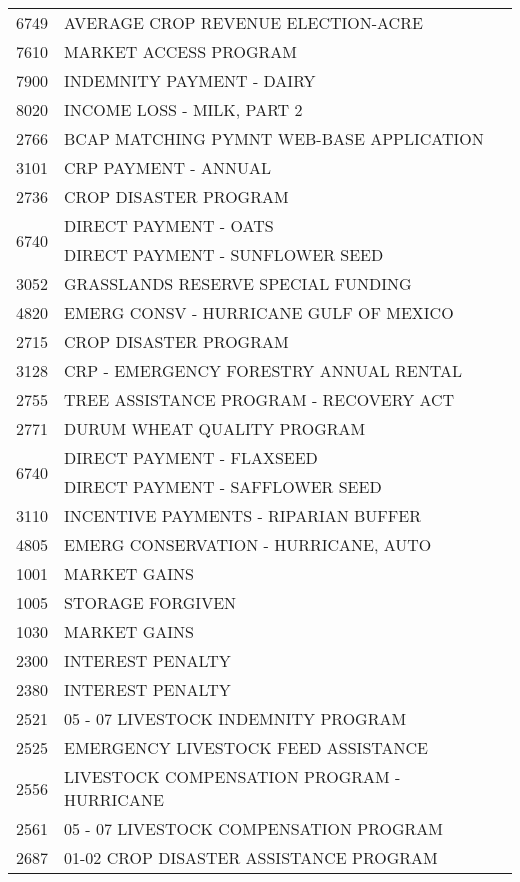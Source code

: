 \begin{longtable}{ll}
\cline{1-2}
6749 & AVERAGE CROP REVENUE ELECTION-ACRE \\
\cline{1-2}
7610 & MARKET ACCESS PROGRAM \\
\cline{1-2}
7900 & INDEMNITY PAYMENT - DAIRY \\
\cline{1-2}
8020 & INCOME LOSS - MILK, PART 2 \\
\cline{1-2}
2766 & BCAP MATCHING PYMNT WEB-BASE APPLICATION \\
\cline{1-2}
3101 & CRP PAYMENT - ANNUAL \\
\cline{1-2}
2736 & CROP DISASTER PROGRAM \\
\cline{1-2}
\multirow[t]{2}{*}{6740} & DIRECT PAYMENT - OATS \\
 & DIRECT PAYMENT - SUNFLOWER SEED \\
\cline{1-2}
3052 & GRASSLANDS RESERVE SPECIAL FUNDING \\
\cline{1-2}
4820 & EMERG CONSV - HURRICANE GULF OF MEXICO \\
\cline{1-2}
2715 & CROP DISASTER PROGRAM \\
\cline{1-2}
3128 & CRP - EMERGENCY FORESTRY ANNUAL RENTAL \\
\cline{1-2}
2755 & TREE ASSISTANCE PROGRAM - RECOVERY ACT \\
\cline{1-2}
2771 & DURUM WHEAT QUALITY PROGRAM \\
\cline{1-2}
\multirow[t]{2}{*}{6740} & DIRECT PAYMENT - FLAXSEED \\
 & DIRECT PAYMENT - SAFFLOWER SEED \\
\cline{1-2}
3110 & INCENTIVE PAYMENTS - RIPARIAN BUFFER \\
\cline{1-2}
4805 & EMERG CONSERVATION - HURRICANE, AUTO \\
\cline{1-2}
1001 & MARKET GAINS \\
\cline{1-2}
1005 & STORAGE FORGIVEN \\
\cline{1-2}
1030 & MARKET GAINS \\
\cline{1-2}
2300 & INTEREST PENALTY \\
\cline{1-2}
2380 & INTEREST PENALTY \\
\cline{1-2}
2521 & 05 - 07 LIVESTOCK INDEMNITY PROGRAM \\
\cline{1-2}
2525 & EMERGENCY LIVESTOCK FEED ASSISTANCE \\
\cline{1-2}
2556 & LIVESTOCK COMPENSATION PROGRAM - HURRICANE \\
\cline{1-2}
2561 & 05 - 07 LIVESTOCK COMPENSATION PROGRAM \\
\cline{1-2}
2687 & 01-02 CROP DISASTER ASSISTANCE PROGRAM \\

\end{longtable}
